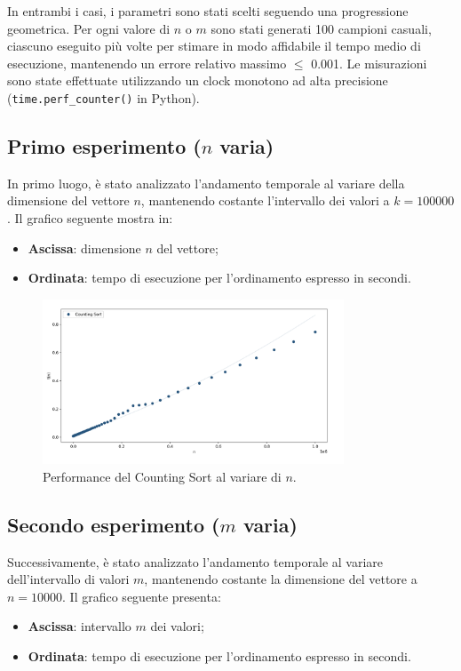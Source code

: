 \documentclass[a4paper, 12pt, oneside]{book}
\begin{document}
\noindent In entrambi i casi, i parametri sono stati scelti seguendo una progressione geometrica.
Per ogni valore di \(n\) o \(m\) sono stati generati 100 campioni casuali, ciascuno eseguito più volte per stimare in modo affidabile il tempo medio di esecuzione, mantenendo un errore relativo massimo \(\leq\) 0.001.
Le misurazioni sono state effettuate utilizzando un clock monotono ad alta precisione (\texttt{time.perf\_counter()} in Python). \\

\subsection{Primo esperimento ($n$ varia)}

\noindent
In primo luogo, è stato analizzato l'andamento temporale al variare della dimensione del vettore \(n\), mantenendo costante l'intervallo dei valori a \(k = 100000\). 
Il grafico seguente mostra in:
\begin{itemize}
    \item \textbf{Ascissa}: dimensione \(n\) del vettore;
    \item \textbf{Ordinata}: tempo di esecuzione per l'ordinamento espresso in secondi.
\end{itemize}

\begin{figure}[H]
    \centering
    \includegraphics[width=0.8\textwidth]{images/grafico_counting_sort_n.png}
    \caption{Performance del Counting Sort al variare di \(n\).}
    \label{fig:counting_sort_n}
\end{figure}

\subsection{Secondo esperimento ($m$ varia)}

\noindent Successivamente, è stato analizzato l'andamento temporale al variare dell'intervallo di valori \(m\), mantenendo costante la dimensione del vettore a \(n = 10000\). 
Il grafico seguente presenta:
\begin{itemize}
    \item \textbf{Ascissa}: intervallo \(m\) dei valori;
    \item \textbf{Ordinata}: tempo di esecuzione per l'ordinamento espresso in secondi.
\end{itemize}
\end{document}
